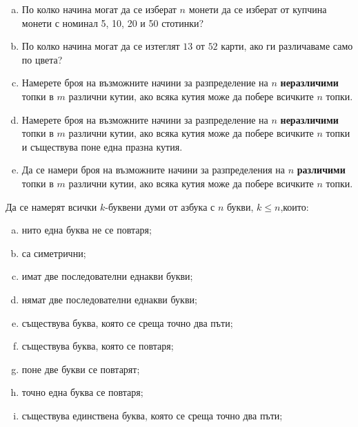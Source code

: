 \begin{problem}
  \begin{enumerate}[a)]
  \item
    По колко начина могат да се изберат $n$ монети да се изберат от купчина монети с номинал 5, 10, 20 и 50 стотинки?
  \item
    По колко начина могат да се изтеглят $13$ от $52$ карти, ако ги различаваме само по цвета?
  \item
    Намерете броя на възможните начини за разпределение на $n$ {\bf неразличими} топки в $m$ различни кутии, ако всяка кутия може да побере
    всичките $n$ топки.
  \item
    Намерете броя на възможните начини за разпределение на $n$ {\bf неразличими} топки в $m$ различни кутии, ако всяка кутия може да побере
    всичките $n$ топки и съществува поне една празна кутия.
  \item
    Да се намери броя на възможните начини за разпределения на $n$ {\bf различими} топки в $m$ различни кутии, ако всяка кутия може да побере всичките $n$ топки.
  \end{enumerate}
\end{problem}



\begin{problem}
  Да се намерят всички $k$-буквени думи от азбука с $n$ букви, $k\leq n$,които:
  \begin{enumerate}[a)]
  \item
    нито една буква не се повтаря;
  \item
    са симетрични;
  \item
    имат две последователни еднакви букви;
  \item
    нямат две последователни еднакви букви;
  \item
    съществува буква, която се среща точно два пъти;
  \item
    съществува буква, която се повтаря;
  \item
    поне две букви се повтарят;
  \item
    точно една буква се повтаря;
  \item
    съществува единствена буква, която се среща точно два пъти;
\end{enumerate}
\end{problem}



